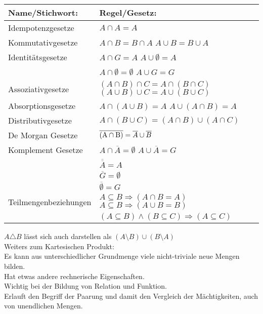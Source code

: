 \documentclass[../gruppenarbeit_1.tex]{subfiles}
\begin{document}
\def\arraystretch{1.5}
\begin{table}[ht]
\begin{tabular}[t]{ll}
\hline
Name/Stichwort: & Regel/Gesetz:\\
\hline
  Idempotenzgesetze &
  $A \cap A = A$\\
  Kommutativgesetze &
  $A \cap B = B \cap A$ \hspace{31mm} $A \cup B = B \cup A$\\
  Identitätsgesetze &
  $A \cap G = A$ \hspace{37.5mm} $A \cup \emptyset = A$\\
  &
  $A \cap \emptyset = \emptyset$ \hspace{39mm} $A \cup G = G$\\
  Assoziativgesetze &
  $(A \cap B) \cap C = A \cap (B \cap C)$
  \hspace{11.5mm}
  $(A \cup B) \cup C = A \cup (B \cup C)$\\
  Absorptionsgesetze &
  $A \cap (A \cup B) = A$ \hspace{28mm} $A \cup (A \cap B) = A$\\
  Distributivgesetze &
  $A \cap (B \cup C) = (A \cap B) \cup ( A \cap C)$\\
  De Morgan Gesetze &
  $\overline{\rm (A \cap B)} = \overline{A} \cup \overline{B}$\\
  Komplement Gesetze &
  $A \cap \overline{A} = \emptyset$ \hspace{39mm} $A \cup \overline{A} = G$\\
  &
  $\overline{\overline{A}} = A$\\
  &
  $\overline{G} = \emptyset$\\
  &
  $\overline{\emptyset} = G$\\
  Teilmengenbeziehungen &
  $A \subseteq B \Rightarrow ( A \cap B = A)$ \hspace{20mm} $A \subseteq B \Rightarrow (A \cup B = B)$\\
  &
  $(A \subseteq B) \wedge (B \subseteq C) \Rightarrow (A \subseteq C)$\\
\hline
\end{tabular}
\end{table}

$A \triangle B$ lässt sich auch darstellen als $(A \setminus B) \cup (B \setminus A)$\\

Weiters zum Kartesischen Produkt:\\
Es kann aus unterschiedlicher Grundmenge viele nicht-triviale neue Mengen bilden.\\
Hat etwas andere rechnerische Eigenschaften.\\
Wichtig bei der Bildung von Relation und Funktion.\\
Erlauft den Begriff der Paarung und damit den Vergleich der Mächtigkeiten, auch von unendlichen Mengen.\\
\end{document}
